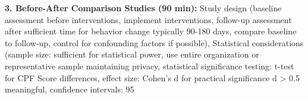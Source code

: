 \documentclass[11pt,a4paper]{article}
\begin{document}
\textbf{3. Before-After Comparison Studies (90 min):} Study design (baseline assessment before interventions, implement interventions, follow-up assessment after sufficient time for behavior change typically 90-180 days, compare baseline to follow-up, control for confounding factors if possible), Statistical considerations (sample size: sufficient for statistical power, use entire organization or representative sample maintaining privacy, statistical significance testing: t-test for CPF Score differences, effect size: Cohen's d for practical significance d > 0.5 meaningful, confidence intervals: 95%
\end{document}
